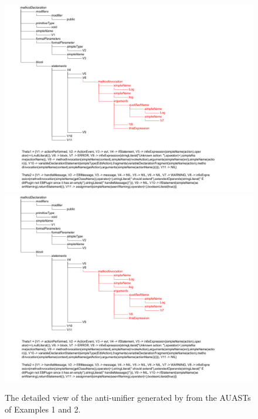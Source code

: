 


\begin{figure}[p]
  \centering\includegraphics[trim={0 10cm 18cm 0},clip,
  width=\textwidth]{Drawing4/SampleAntiUnifier.png}
  \centering\includegraphics[trim={3.5cm 0 8cm 33cm},clip,
  width=\textwidth]{Drawing4/SampleAntiUnifier.png}
  \caption{The detailed view of the anti-unifier generated by  from the AUASTs of Examples 1 and 2.}
  \label{fig:meth-anti-unifier}
\end{figure}



